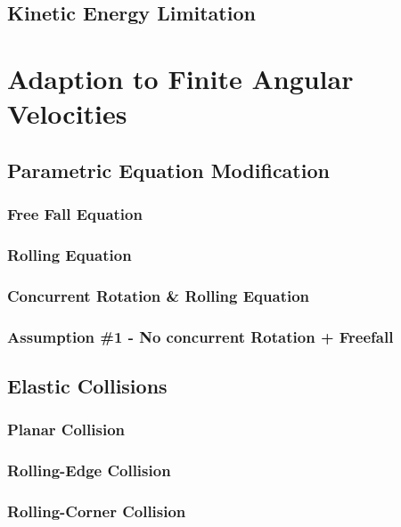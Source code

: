 	\subsection{Kinetic Energy Limitation}

\section{Adaption to Finite Angular Velocities}

	\subsection{Parametric Equation Modification}

		\subsubsection{Free Fall Equation}

		\subsubsection{Rolling Equation}

		\subsubsection{Concurrent Rotation \& Rolling Equation}

		\subsubsection{Assumption \#1 - No concurrent Rotation + Freefall}

	\subsection{Elastic Collisions}

		\subsubsection{Planar Collision}

		\subsubsection{Rolling-Edge Collision}

		\subsubsection{Rolling-Corner Collision}

